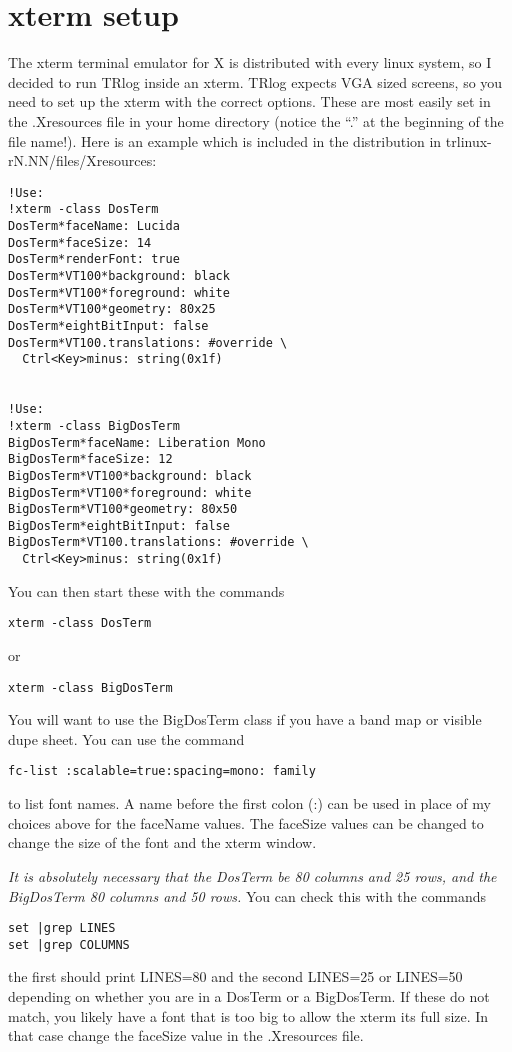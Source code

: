 \documentclass[12pt]{article}
\begin{document}
\section{xterm setup}
The xterm terminal emulator
for X is distributed with every linux system,
so I decided to run TRlog inside an xterm.
TRlog expects VGA sized screens, so you need to set up the xterm with
the correct options. These are most easily set in the .Xresources
file
in your home directory (notice the ``.'' at the beginning of the
file name!).  Here is an example which is included in the
distribution in trlinux-rN.NN/files/Xresources:
\begin{verbatim}
!Use:
!xterm -class DosTerm
DosTerm*faceName: Lucida
DosTerm*faceSize: 14
DosTerm*renderFont: true
DosTerm*VT100*background: black
DosTerm*VT100*foreground: white
DosTerm*VT100*geometry: 80x25
DosTerm*eightBitInput: false
DosTerm*VT100.translations: #override \
  Ctrl<Key>minus: string(0x1f)


!Use:
!xterm -class BigDosTerm
BigDosTerm*faceName: Liberation Mono
BigDosTerm*faceSize: 12
BigDosTerm*VT100*background: black
BigDosTerm*VT100*foreground: white
BigDosTerm*VT100*geometry: 80x50
BigDosTerm*eightBitInput: false
BigDosTerm*VT100.translations: #override \
  Ctrl<Key>minus: string(0x1f)
\end{verbatim}

You can then start these with the commands
\begin{verbatim}
xterm -class DosTerm
\end{verbatim}
or
\begin{verbatim}
xterm -class BigDosTerm
\end{verbatim}
You will want to use the BigDosTerm class if you have a band map  or visible
dupe sheet.
You can use the command
\begin{verbatim}
fc-list :scalable=true:spacing=mono: family
\end{verbatim}
to list font names.
A name before the first colon (:) can be used
in place of my choices above for the faceName values. The faceSize
values can be changed to change the size of the font and the xterm
window\index{Changing the font size}.

{\em It is absolutely necessary that
the DosTerm be 80 columns and 25 rows,
and the BigDosTerm 80 columns and 50 rows. }
You can check this with the commands
\begin{verbatim}
set |grep LINES
set |grep COLUMNS
\end{verbatim}
the first should print LINES=80 and the second LINES=25 or LINES=50 depending
on whether you are in a DosTerm or a BigDosTerm. If these do not
match, you likely have a font that is too big to allow the xterm its
full size. In that case change the faceSize value in the .Xresources file.
\end{document}
